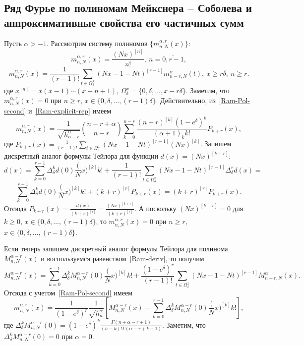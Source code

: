 \subsection{Ряд Фурье по полиномам Мейкснера -- Соболева и аппроксимативные свойства его частичных сумм}

Пусть $\alpha>-1$. Рассмотрим систему полиномов $\{m_{n,N}^{\alpha,r}(x)\}$:
\begin{equation*}
m_{n,N}^{\alpha,r}(x)=\frac{(Nx)^{[n]}}{n!},\ n=\overline{0,r-1},
\end{equation*}
\begin{equation}\label{Ram-Pol-second}
m_{n,N}^{\alpha,r}(x)=
\frac{1}{(r-1)!}\sum\limits_{t\in \Omega_\delta^x}(Nx-1-Nt)^{[r-1]}m_{n-r,N}^\alpha(t),\ x\ge r\delta,\ n\ge r.
\end{equation}
где $x^{[n]}=x(x-1)\cdots(x-n+1)$, $\Omega_\delta^x=\{0, \delta, \ldots, x-r\delta\}$. Заметим, что $m_{n,N}^{\alpha,r}(x)=0$ при $n\ge r$, $x\in\{0, \delta, \ldots, (r-1)\delta\}$. Действительно, из~\eqref{Ram-Pol-second} и~\eqref{Ram-explicit-rep} имеем
$$
m_{n,N}^{\alpha,r}(x)=\frac{1}{\sqrt{h_{n-r}^\alpha}}
{\binom{n-r+\alpha}{n-r}}\sum_{k=0}^{n-r}{\frac{(n-r)^{[k]}\left(1-e^\delta\right)^k}{(\alpha+1)_kk!}}P_{k+r}(x),
$$
где $P_{k+r}(x)=\frac{1}{(r-1)!}\sum\limits_{t\in \Omega_\delta^x}(Nx-1-Nt)^{[r-1]}(Nx)^{[k]}$. Запишем дискретный аналог формулы Тейлора для функции $d(x)=(Nx)^{[k+r]}$:
$$
d(x)=\sum_{k=0}^{r-1}\Delta_\delta^kd(0){\frac(Nx)^{[k]}{k!}}+\frac{1}{(r-1)!}\sum\limits_{t\in \Omega_\delta^x}(Nx-1-Nt)^{[r-1]}\Delta^r_\delta d(x)=
$$
$$
\sum_{k=0}^{r-1}\Delta_\delta^kd(0){\frac(Nx)^{[k]}{k!}}+(k+r)^{[r]}P_{k+r}(x)=(k+r)^{[r]}P_{k+r}(x).
$$
Отсюда $P_{k+r}(x)=\frac{d(x)}{(k+r)^{[r]}}=\frac{(Nx)^{[k+r]}}{(k+r)^{[r]}}$. А поскольку $(Nx)^{[k+r]}=0$ для $k\ge0$, $x\in\{0, \delta, \ldots, (r-1)\delta\}$, то $m_{n,N}^{\alpha,r}(x)=0$ при $n\ge r$, $x\in\{0, \delta, \ldots, (r-1)\delta\}$.

Если теперь запишем дискретный аналог формулы Тейлора для полинома $M_{n,N}^{\alpha-r}(x)$ и воспользуемся равенством~\eqref{Ram-deriv}, то получим
$$
M_{n,N}^{\alpha-r}(x)=\sum_{k=0}^{r-1}\Delta_\delta^kM_{n,N}^{\alpha-r}(0){\frac(Nx)^{[k]}{k!}}+
\frac{(1-e^\delta)^r}{(r-1)!}\sum\limits_{t\in \Omega_\delta^x}(Nx-1-Nt)^{[r-1]}M_{n-r,N}^{\alpha}(x).
$$
Отсюда с учетом~\eqref{Ram-Pol-second} имеем
\begin{equation}\label{Ram-rep-alpha-r}
m_{n,N}^{\alpha,r}(x)= \frac{1}{(1-e^\delta)^r}\frac{1}{\sqrt{h_{n}^{\alpha}}}\left[M_{n,N}^{\alpha-r}(x)-\sum_{k=0}^{r-1}\Delta_\delta^kM_{n,N}^{\alpha-r}(0){\frac(Nx)^{[k]}{k!}}\right],
\end{equation}
где $\Delta^k_\delta M_{n,N}^{\alpha-r}(0)=(1-e^\delta)^k\frac{\Gamma(n+\alpha-r+1)}{(n-k)!\Gamma(\alpha-r+k+1)}$. Заметим, что $\Delta^k_\delta M_{n,N}^{\alpha-r}(0)=0$ при $\alpha=0$.

